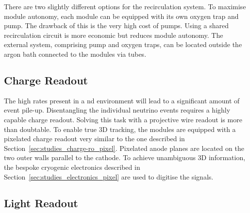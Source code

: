 There are two slightly different options for the recirculation system.
To maximise module autonomy, each module can be equipped with its own oxygen trap and \lar{} pump.
The drawback of this is the very high cost of \lar{} pumps.
Using a shared recirculation circuit is more economic but reduces module autonomy.
The external system, comprising pump and oxygen traps, can be located outside the argon bath connected to the modules via tubes.


\subsection{Charge Readout}
\label{sec:ac_argoncube_charge-ro}

The high rates present in a \gls{nd} environment will lead to a significant amount of event pile-up.
Disentangling the individual neutrino events requires a highly capable charge readout.
Solving this task with a projective wire readout is more than doubtable.
To enable true 3D tracking, the modules are equipped with a pixelated charge readout very similar to the one described in Section~\ref{sec:studies_charge-ro_pixel}.
Pixelated anode planes are located on the two outer walls parallel to the cathode.
To achieve unambiguous 3D information, the bespoke \pixlar{} cryogenic electronics described in Section~\ref{sec:studies_electronics_pixel} are used to digitise the signals.


\subsection{Light Readout}
\label{sec:ac_argoncube_light-ro}

